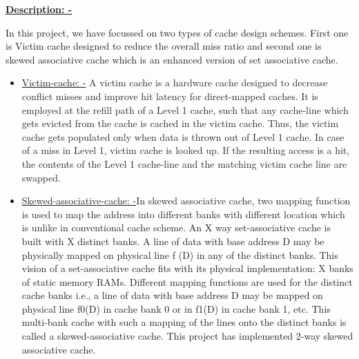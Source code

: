 \documentclass[12pt]{article}
\begin{document}
{\fontsize{22pt}{26.4pt}\selectfont \textbf{\uline{Description: -}}\par}\par

{\fontsize{14pt}{16.8pt}\selectfont In this project, we have focussed on two types of cache design schemes. First one is Victim cache designed to reduce the overall miss ratio and second one is skewed associative cache which is an enhanced version of set associative cache.\par}\par

\begin{itemize}
	\item {\fontsize{14pt}{16.8pt}\selectfont \uline{Victim-cache: -}\textcolor[HTML]{222222}{ A victim cache is a hardware cache designed to decrease conflict misses and improve hit latency for direct-mapped caches. It is employed at the refill path of a Level 1 cache, such that any cache-line which gets evicted from the cache is cached in the victim cache. Thus, the victim cache gets populated only when data is thrown out of Level 1 cache. In case of a miss in Level 1, victim cache is looked up. If the resulting access is a hit, the contents of the Level 1 cache-line and the matching victim cache line are swapped.}\par}\par

	\item {\fontsize{14pt}{16.8pt}\selectfont \textcolor[HTML]{222222}{\uline{Skewed-associative-cache: -}In skewed associative cache, two mapping function is used to map the address into different banks with different location which is unlike in conventional cache scheme. }An X way set-associative cache is built with X distinct banks. A line of data with base address D may be physically mapped on physical line f (D) in any of the distinct banks. This vision of a set-associative cache fits with its physical implementation: X banks of static memory RAMs. Different mapping functions are used for the distinct cache banks i.e., a line of data with base address D may be mapped on physical line f0(D) in cache bank 0 or in f1(D) in cache bank 1, etc. This multi-bank cache with such a mapping of the lines onto the distinct banks is called a skewed-associative cache. This project has implemented 2-way skewed associative cache.\par}
\end{itemize}\par
\end{document}
